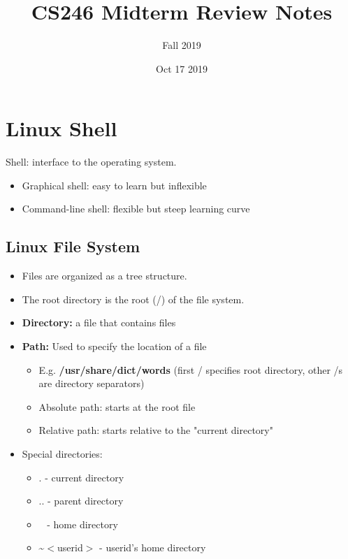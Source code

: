 \documentclass[12pt]{article}
\title{CS246 Midterm Review Notes}
\author{Fall 2019}
\date{Oct 17 2019}
\newcommand{\comment}[1]{}
\begin{document}
\maketitle

\tableofcontents
\newpage
\section{Linux Shell}
Shell: interface to the operating system.
\begin{itemize}
    \item Graphical shell: easy to learn but inflexible
    \item Command-line shell: flexible but steep learning curve
\end{itemize}

\comment{
\subsection{History of Shells}
\begin{itemize}
    \item Original was created by Stephen Borne: Borne Shell
    \item Borne Shell was upgraded to Borne Again Shell (Bash)
    \item Other shells: C Shell (csh), Turbo C Shell (tcsh), Korn Shell (ksh)
    
\end{itemize}
}

\subsection{Linux File System}
\begin{itemize}
    \item Files are organized as a tree structure.
    \item The root directory is the root (/) of the file system.
    \item \textbf{Directory:} a file that contains files
    \item \textbf{Path:} Used to specify the location of a file
        \begin{itemize}
            \item E.g. \textbf{/usr/share/dict/words} (first / specifies root directory, other /s are directory separators)
            \item Absolute path: starts at the root file
            \item Relative path: starts relative to the "current directory"
        \end{itemize}
    \item Special directories:
        \begin{itemize}
            \item . - current directory
            \item .. - parent directory
            \item ~ - home directory
            \item \~{}$<$userid$>$ - userid's home directory
        \end{itemize}
\end{itemize}
\end{document}
